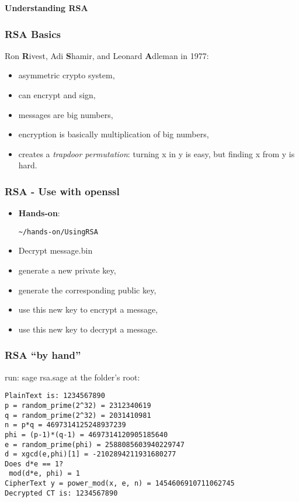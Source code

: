 \begin{frame}
  \begin{center}
    {\bf Understanding RSA}
  \end{center}
\end{frame}

\begin{frame}
  \frametitle{RSA Basics}
  Ron {\bf R}ivest, Adi {\bf S}hamir, and Leonard {\bf A}dleman in 1977:
  \begin{itemize}
    \item asymmetric crypto system,
    \item can encrypt and sign,
    \item messages are big numbers,
    \item encryption is basically multiplication of big numbers,
    \item creates a \textit{trapdoor permutation}: turning x in y is easy, but
      finding x from y is hard.
  \end{itemize}

\end{frame}

\begin{frame}[fragile]
  \frametitle{RSA - Use with openssl}
  \begin{itemize}
  \item {\bf Hands-on}:

\begin{lstlisting}
~/hands-on/UsingRSA
\end{lstlisting}

   \item Decrypt message.bin
   \item generate a new private key,
   \item generate the corresponding public key,
   \item use this new key to encrypt a message,
   \item use this new key to decrypt a message. 
   
  \end{itemize}
\end{frame}


\begin{frame}[fragile]
  \frametitle{RSA ``by hand''}
run: sage rsa.sage at the folder's root:
\begin{lstlisting}[basicstyle=\tiny]
PlainText is: 1234567890
p = random_prime(2^32) = 2312340619
q = random_prime(2^32) = 2031410981
n = p*q = 4697314125248937239
phi = (p-1)*(q-1) = 4697314120905185640
e = random_prime(phi) = 2588085603940229747
d = xgcd(e,phi)[1] = -2102894211931680277
Does d*e == 1?
 mod(d*e, phi) = 1
CipherText y = power_mod(x, e, n) = 1454606910711062745
Decrypted CT is: 1234567890
\end{lstlisting}

\end{frame}

